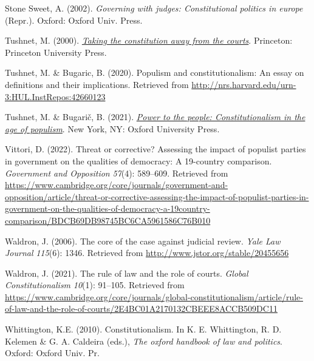 \documentclass[
  abstract]{article}
\newlength{\cslhangindent}
\newlength{\cslentryspacingunit} %
\newenvironment{CSLReferences}[2] %
 {%
  \setlength{\parindent}{0pt}
  \ifodd #1
  \let\oldpar\par
  \def\par{\hangindent=\cslhangindent\oldpar}
  \fi
  \setlength{\parskip}{#2\cslentryspacingunit}
 }%
 {}
\begin{document}
\begin{CSLReferences}{1}{0}
\leavevmode{}%
Stone Sweet, A. (2002). \emph{Governing with judges: Constitutional
politics in europe} (Repr.). Oxford: {Oxford Univ. Press}.

\leavevmode{}%
Tushnet, M. (2000).
\emph{\href{https://doi.org/10.1515/9781400822973}{Taking the
constitution away from the courts}}. Princeton: {Princeton University
Press}.

\leavevmode{}%
Tushnet, M. \& Bugaric, B. (2020). Populism and constitutionalism: An
essay on definitions and their implications. Retrieved from
\url{http://nrs.harvard.edu/urn-3:HUL.InstRepos:42660123}

\leavevmode{}%
Tushnet, M. \& Bugarič, B. (2021).
\emph{\href{https://doi.org/10.1093/oso/9780197606711.001.0001}{Power to
the people: Constitutionalism in the age of populism}}. New York, NY:
{Oxford University Press}.

\leavevmode{}%
Vittori, D. (2022). Threat or corrective? Assessing the impact of
populist parties in government on the qualities of democracy: A
19-country comparison. \emph{Government and Opposition} \emph{57}(4):
589--609. Retrieved from
\url{https://www.cambridge.org/core/journals/government-and-opposition/article/threat-or-corrective-assessing-the-impact-of-populist-parties-in-government-on-the-qualities-of-democracy-a-19country-comparison/BDCB69DB98745BC6CA5961586C76B010}

\leavevmode{}%
Waldron, J. (2006). The core of the case against judicial review.
\emph{Yale Law Journal} \emph{115}(6): 1346. Retrieved from
\url{http://www.jstor.org/stable/20455656}

\leavevmode{}%
Waldron, J. (2021). The rule of law and the role of courts. \emph{Global
Constitutionalism} \emph{10}(1): 91--105. Retrieved from
\url{https://www.cambridge.org/core/journals/global-constitutionalism/article/rule-of-law-and-the-role-of-courts/2E4BC01A2170132CBEEE8ACCB509DC11}

\leavevmode{}%
Whittington, K.E. (2010). Constitutionalism. In K. E. Whittington, R. D.
Kelemen \& G. A. Caldeira (eds.), \emph{The oxford handbook of law and
politics}. Oxford: {Oxford Univ. Pr}.

\end{CSLReferences}
\end{document}
